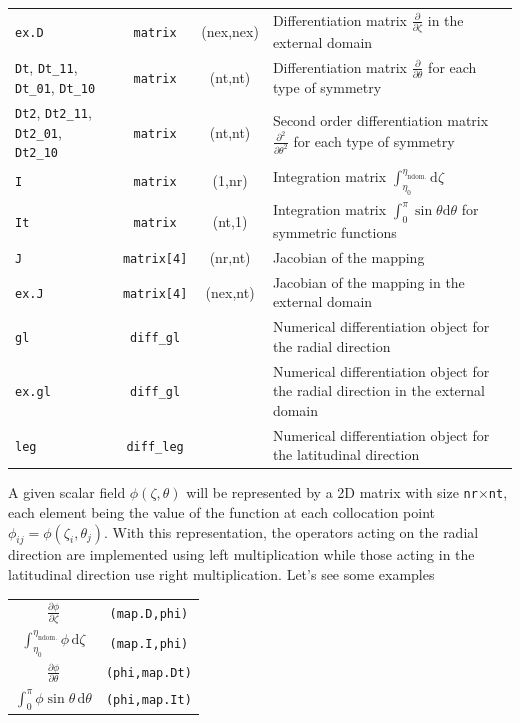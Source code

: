 \begin{longtable}{p{3.7cm}ccp{5cm}}
\texttt{ex.D}&\texttt{matrix}&(nex,nex)& Differentiation matrix $\frac{\partial}{\partial\zeta}$ in
the external domain\\
\texttt{Dt}, \texttt{Dt\_11}, \texttt{Dt\_01}, \texttt{Dt\_10}&\texttt{matrix}&(nt,nt)&
Differentiation matrix $\frac{\partial}{\partial\theta}$ for each type of symmetry\\
\texttt{Dt2}, \texttt{Dt2\_11}, \texttt{Dt2\_01}, \texttt{Dt2\_10}&\texttt{matrix}&(nt,nt)&
Second order differentiation matrix $\frac{\partial^2}{\partial\theta^2}$ for each type of symmetry\\
\texttt{I}&\texttt{matrix}&(1,nr)&Integration matrix $\int_{\eta_0}^{\eta_\mathrm{ndom.}}\mathrm{d}\zeta$\\
\texttt{It}&\texttt{matrix}&(nt,1)&Integration matrix $\int_0^\pi\sin\theta\mathrm{d}\theta$ for symmetric functions\\
\texttt{J}&\texttt{matrix[4]}&(nr,nt)&Jacobian of the mapping\\
\texttt{ex.J}&\texttt{matrix[4]}&(nex,nt)&Jacobian of the mapping in the external
domain\\
\texttt{gl}&\texttt{diff\_gl}&&Numerical differentiation object for the radial direction\\
\texttt{ex.gl}&\texttt{diff\_gl}&&Numerical differentiation object for the radial direction in the
external domain\\
\texttt{leg}&\texttt{diff\_leg}&&Numerical differentiation object for the latitudinal direction\\
\end{longtable}

\renewcommand{\arraystretch}{1} 

A given scalar field $\phi(\zeta,\theta)$ will be represented by a 2D matrix with size \verb|nr|$\times$\verb|nt|,
each element being the value of the function at each collocation point $\phi_{ij}=\phi(\zeta_i,\theta_j)$.
With this representation, the operators acting on the radial direction are implemented using left multiplication
while those acting in the latitudinal direction use right multiplication. Let's see some examples

\medskip
\renewcommand{\arraystretch}{2} 
\begin{tabular}{c@{\quad:\quad}c}
$\displaystyle\frac{\partial\phi}{\partial\zeta}$&\verb|(map.D,phi)|\\
$\displaystyle\int_{\eta_0}^{\eta_\mathrm{ndom.}}\phi\,\mathrm{d}\zeta$&\verb|(map.I,phi)|\\
$\displaystyle\frac{\partial\phi}{\partial\theta}$&\verb|(phi,map.Dt)|\\
$\displaystyle\int_0^\pi\phi\sin\theta\,\mathrm{d}\theta$&\verb|(phi,map.It)|\\
\end{tabular} 
\renewcommand{\arraystretch}{1} 
\medskip

